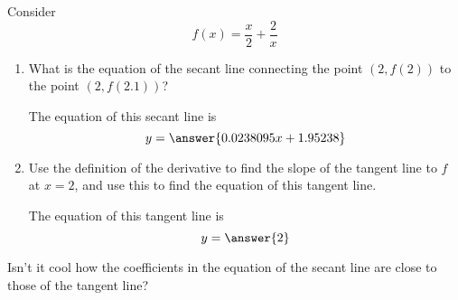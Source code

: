 \documentclass{ximera}
\author{Steven Gubkin}
\begin{document}
\begin{exercise}



Consider 
\[
f(x) = \frac{x}{2}+\frac{2}{x}
\]



\begin{enumerate}
\item What is the equation of the secant line connecting the point $(2,f(2))$ to the point $(2,f(2.1))$? 
\begin{prompt} 
The equation of this secant line is
$$ y = \answer{0.0238095x+1.95238 }$$ 
\end{prompt}

\item  Use the definition of the derivative to find the slope of the tangent line to $f$ at $x=2$, and use this to find the equation of this tangent line.

\begin{prompt} 
The equation of this tangent line is
$$ y = \answer{2}$$ 
\end{prompt}

\end{enumerate}

Isn't it cool how the coefficients in the equation of the secant line are close to those of the tangent line?
\end{exercise}
\end{document}
